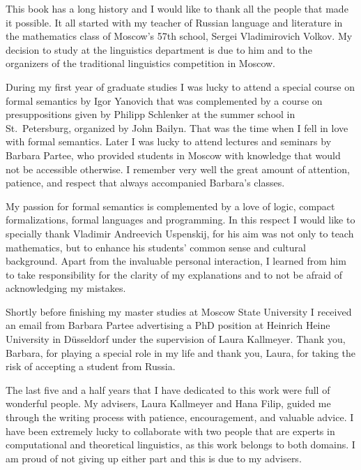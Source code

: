 \begin{refsection}

This book has a long history and I would like to thank all the people that made it possible. It all started with my teacher of Russian language and literature in the mathematics class of Moscow's 57th school, Sergei Vladimirovich Volkov. My decision to study at the linguistics department is due to him and to the organizers of the traditional linguistics competition in Moscow.

During my first year of graduate studies I was lucky to attend a special course on formal semantics by Igor Yanovich that was complemented by a course on presuppositions given by Philipp Schlenker at the summer school in St.\ Petersburg, organized by John Bailyn. That was the time when I fell in love with formal semantics. Later I was lucky to attend lectures and seminars by Barbara Partee, who provided students in Moscow with knowledge that would not be accessible otherwise. I remember very well the great amount of attention, patience, and respect that always accompanied Barbara's classes. 

My passion for formal semantics is complemented by a love of logic, compact formalizations, formal languages and programming. In this respect I would like to specially thank Vladimir Andreevich Uspenskij, for his aim was not only to teach mathematics, but to enhance his students' common sense and cultural background. Apart from the invaluable personal interaction, I learned from him to take responsibility for the clarity of my explanations and to not be afraid of acknowledging my mistakes.

Shortly before finishing my master studies at Moscow State University I received an email from Barbara Partee advertising a PhD position at Heinrich Heine University in Düsseldorf under the supervision of Laura Kallmeyer. Thank you, Barbara, for playing a special role in my life and thank you, Laura, for taking the risk of accepting a student from Russia.

The last five and a half years that I have dedicated to this work were full of wonderful people. My advisers, Laura Kallmeyer and Hana Filip, guided me through the writing process with patience, encouragement, and valuable advice. I have been extremely lucky to collaborate with two people that are experts in computational and theoretical linguistics, as this work belongs to both domains. I am proud of not giving up either part and this is due to my advisers. 


\end{refsection}
